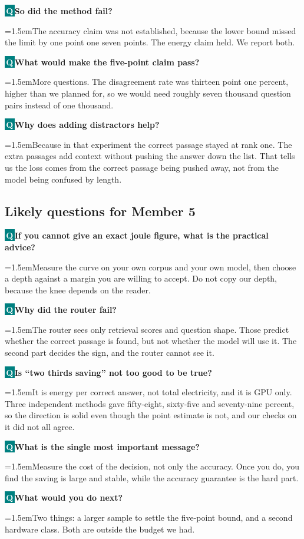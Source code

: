\documentclass[11pt,a4paper]{article}
\newcommand{\qa}[2]{%
  \needspace{4\baselineskip}%
  \par\addvspace{7pt}%
  {\noindent\colorbox{teal}{\textcolor{white}{\bfseries\,Q\,}}\;\textbf{#1}\par}%
  \addvspace{2pt}%
  {\leftskip=1.5em\relax\color{ink}#2\par}%
  \addvspace{2pt}}
\begin{document}
\qa{So did the method fail?}{The accuracy claim was not established, because the lower bound missed the limit by one point one seven points. The energy claim held. We report both.}

\qa{What would make the five-point claim pass?}{More questions. The disagreement rate was thirteen point one percent, higher than we planned for, so we would need roughly seven thousand question pairs instead of one thousand.}

\qa{Why does adding distractors help?}{Because in that experiment the correct passage stayed at rank one. The extra passages add context without pushing the answer down the list. That tells us the loss comes from the correct passage being pushed away, not from the model being confused by length.}

\subsection*{Likely questions for Member 5}

\qa{If you cannot give an exact joule figure, what is the practical advice?}{Measure the curve on your own corpus and your own model, then choose a depth against a margin you are willing to accept. Do not copy our depth, because the knee depends on the reader.}

\qa{Why did the router fail?}{The router sees only retrieval scores and question shape. Those predict whether the correct passage is found, but not whether the model will use it. The second part decides the sign, and the router cannot see it.}

\qa{Is ``two thirds saving'' not too good to be true?}{It is energy per correct answer, not total electricity, and it is GPU only. Three independent methods gave fifty-eight, sixty-five and seventy-nine percent, so the direction is solid even though the point estimate is not, and our checks on it did not all agree.}

\qa{What is the single most important message?}{Measure the cost of the decision, not only the accuracy. Once you do, you find the saving is large and stable, while the accuracy guarantee is the hard part.}

\qa{What would you do next?}{Two things: a larger sample to settle the five-point bound, and a second hardware class. Both are outside the budget we had.}
\end{document}
